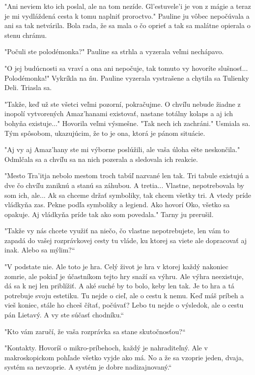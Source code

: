 \documentclass{book}
\begin{document}
"$ $Ani neviem kto ich poslal, ale na tom nezíde. Gl'estuvele'i je von z mágie a teraz je mi vydláždená cesta k tomu naplniť proroctvo."$ $ Pauline ju vôbec nepočúvala a ani sa tak netvárila. Bola rada, že sa mala o čo oprieť a tak sa malátne opierala o stenu chrámu.

"$ $Počuli ste polodémonka?"$ $ Pauline sa strhla a vyzerala veľmi nechápavo.

"$ $O jej budúcnosti sa vraví a ona ani nepočuje, tak tomuto vy hovoríte slušnosť... Polodémonka!"$ $ Vykríkla na ňu. Pauline vyzerala vystrašene a chytila sa Tulienky Deli. Triasla sa.

"$ $Takže, keď už ste všetci veľmi pozorní, pokračujme. O chvíľu nebude žiadne z inopolí vytvorených Amaz'hanami existovať, nastane totálny kolaps a aj ich bohyňa existuje..."$ $ Hovorila veľmi výsmešne. "$ $Tak nech ich zachráni."$ $ Usmiala sa. Tým spôsobom, ukazujúcim, že to je ona, ktorá je pánom situácie.

"$ $Aj vy aj Amaz'hany ste mi výborne poslúžili, ale vaša úloha ešte neskončila."$ $ Odmlčala sa a chvíľu sa na nich pozerala a sledovala ich reakcie.

"$ $Mesto Tra'itja nebolo mestom troch tabúľ nazvané len tak. Tri tabule existujú a dve čo chvíľu zaniknú a stanú sa záhubou. A tretia... Vlastne, nepotrebovala by som ich, ale... Ak sa chceme držať symboliky, tak chcem všetky tri. A vtedy príde vládkyňa zas. Pekne podľa symboliky a legiend. Ako hovorí Oko, všetko sa opakuje. Aj vládkyňa príde tak ako som povedala."$ $ Tarny ju prerušil.

"$ $Takže vy nás chcete využiť na niečo, čo vlastne nepotrebujete, len vám to zapadá do vašej rozprávkovej cesty tu vláde, ku ktorej sa viete ale dopracovať aj inak. Alebo sa mýlim?“

"$ $V podstate nie. Ale toto je hra. Celý život je hra v ktorej každý nakoniec zomrie, ale pokiaľ je účastníkom tejto hry snaží sa výhru. Ale výhra neexistuje, dá sa k nej len priblížiť. A aké suché by to bolo, keby len tak. Je to hra a tá potrebuje svoju estetiku. Tu nejde o cieľ, ale o cestu k nemu. Keď máš príbeh a vieš koniec, stále ho chceš čítať, počúvať? Lebo tu nejde o výsledok, ale o cestu pán Lietavý. A vy ste súčasť chodníku.“

"$ $Kto vám zaručí, že vaša rozprávka sa stane skutočnosťou?“

"$ $Kontakty. Hovoríš o mikro-príbehoch, každý je nahraditeľný. Ale v makroskopickom pohľade všetko vyjde ako má. No a že sa vzoprie jeden, dvaja, systém sa nevzoprie. A systém je dobre nadizajnovaný.“
\end{document}
